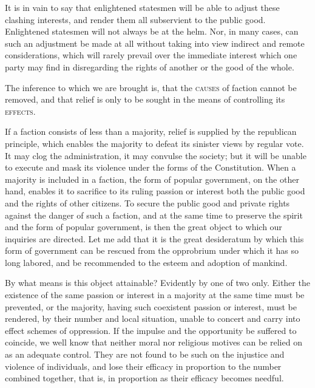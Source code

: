 It is in vain to say that enlightened statesmen will be able to adjust these clashing interests, and render them all subservient to the public good. Enlightened statesmen will not always be at the helm. Nor, in many cases, can such an adjustment be made at all without taking into view indirect and remote considerations, which will rarely prevail over the immediate interest which one party may find in disregarding the rights of another or the good of the whole.

The inference to which we are brought is, that the \textsc{causes} of faction cannot be removed, and that relief is only to be sought in the means of controlling its \textsc{effects}.

If a faction consists of less than a majority, relief is supplied by the republican principle, which enables the majority to defeat its sinister views by regular vote. It may clog the administration, it may convulse the society; but it will be unable to execute and mask its violence under the forms of the Constitution. When a majority is included in a faction, the form of popular government, on the other hand, enables it to sacrifice to its ruling passion or interest both the public good and the rights of other citizens. To secure the public good and private rights against the danger of such a faction, and at the same time to preserve the spirit and the form of popular government, is then the great object to which our inquiries are directed. Let me add that it is the great desideratum by which this form of government can be rescued from the opprobrium under which it has so long labored, and be recommended to the esteem and adoption of mankind.

By what means is this object attainable? Evidently by one of two only. Either the existence of the same passion or interest in a majority at the same time must be prevented, or the majority, having such coexistent passion or interest, must be rendered, by their number and local situation, unable to concert and carry into effect schemes of oppression. If the impulse and the opportunity be suffered to coincide, we well know that neither moral nor religious motives can be relied on as an adequate control. They are not found to be such on the injustice and violence of individuals, and lose their efficacy in proportion to the number combined together, that is, in proportion as their efficacy becomes needful.

